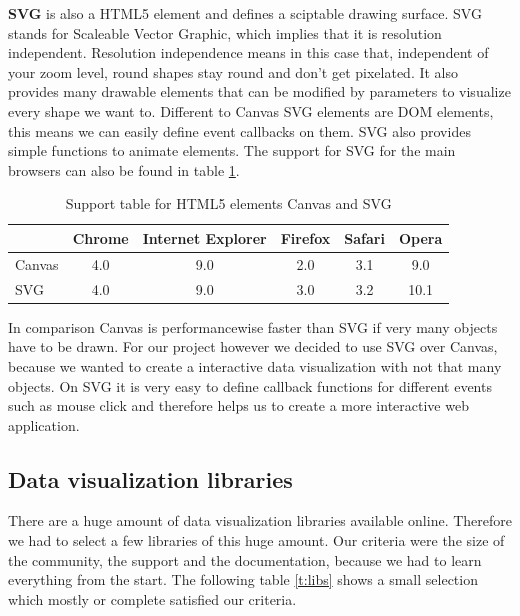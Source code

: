 \documentclass{bioinfo}
\begin{document}
\textbf{SVG} is also a HTML5 element and defines a sciptable drawing surface. SVG stands for Scaleable Vector Graphic, which implies that it is resolution independent. Resolution independence means in this case that, independent of your zoom level, round shapes stay round and don't get pixelated. 
It also provides many drawable elements that can be modified by parameters to visualize every shape we want to. Different to Canvas SVG elements are DOM elements, this means we can easily define event callbacks on them. SVG also provides simple functions to animate elements.
The support for SVG for the main browsers can also be found in table \ref{t:support}.

\begin{table}
\begin{tabular}{ l | c | c | c | c | c } 
		& Chrome & Internet Explorer & Firefox & Safari & Opera \\
\hline
Canvas	& 4.0 & 9.0 & 2.0 &	3.1 & 9.0 \\
SVG		& 4.0 & 9.0 & 3.0 &	3.2 & 10.1 \\
\end{tabular}
\caption{Support table for HTML5 elements Canvas and SVG} \label{t:support}
\end{table}

In comparison Canvas is performancewise faster than SVG if very many objects have to be drawn.
For our project however we decided to use SVG over Canvas, because we wanted to create a interactive data visualization with not that many objects. On SVG it is very easy to define callback functions for different events such as mouse click and therefore helps us to create a more interactive web application.

\subsection{Data visualization libraries}
There are a huge amount of data visualization libraries available online.
Therefore we had to select a few libraries of this huge amount. 
Our criteria were the size of the community, the support and the documentation, because we had to learn everything from the start.
The following table \ref{t:libs} shows a small selection which mostly or complete satisfied our criteria.
\end{document}
